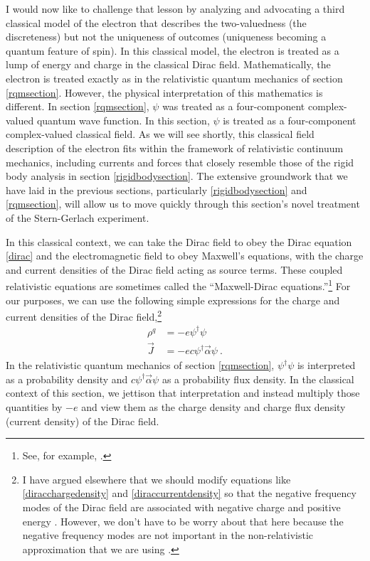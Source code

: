 \documentclass[12pt,secnumarabic,amsmath,amssymb,balancelastpage,nofootinbib]{article}
\begin{document}
I would now like to challenge that lesson by analyzing and advocating a third classical model of the electron that describes the two-valuedness (the discreteness) but not the uniqueness of outcomes (uniqueness becoming a quantum feature of spin).  In this classical model, the electron is treated as a lump of energy and charge in the classical Dirac field.  Mathematically, the electron is treated exactly as in the relativistic quantum mechanics of section \ref{rqmsection}.  However, the physical interpretation of this mathematics is different.  In section \ref{rqmsection}, $\psi$ was treated as a four-component complex-valued quantum wave function.  In this section, $\psi$ is treated as a four-component complex-valued classical field.  As we will see shortly, this classical field description of the electron fits within the framework of relativistic continuum mechanics, including currents and forces that closely resemble those of the rigid body analysis in section \ref{rigidbodysection}.  The extensive groundwork that we have laid in the previous sections, particularly \ref{rigidbodysection} and \ref{rqmsection}, will allow us to move quickly through this section's novel treatment of the Stern-Gerlach experiment.

In this classical context, we can take the Dirac field to obey the Dirac equation \eqref{dirac} and the electromagnetic field to obey Maxwell's equations, with the charge and current densities of the Dirac field acting as source terms.  These coupled relativistic equations are sometimes called the ``Maxwell-Dirac equations.''\footnote{See, for example, \citet{gross1966, glassey1979, flato1987}.}  For our purposes, we can use the following simple expressions for the charge and current densities of the Dirac field,\footnote{I have argued elsewhere that we should modify equations like \eqref{diracchargedensity} and \eqref{diraccurrentdensity} so that the negative frequency modes of the Dirac field are associated with negative charge and positive energy \citep{positrons}.  However, we don't have to be worry about that here because the negative frequency modes are not important in the non-relativistic approximation that we are using \citep[pg.\ 10]{bjorkendrell}.}
\begin{align}
\rho^q&=-e \psi^\dagger \psi
\label{diracchargedensity}
\\
\vec{J}&=-e c \psi^\dagger \vec{\alpha} \psi
\label{diraccurrentdensity}\ .
\end{align}
In the relativistic quantum mechanics of section \ref{rqmsection}, $\psi^\dagger \psi$ is interpreted as a probability density and $c \psi^\dagger \vec{\alpha} \psi$ as a probability flux density.  In the classical context of this section, we jettison that interpretation and instead multiply those quantities by $-e$ and view them as the charge density and charge flux density (current density) of the Dirac field.
\end{document}
